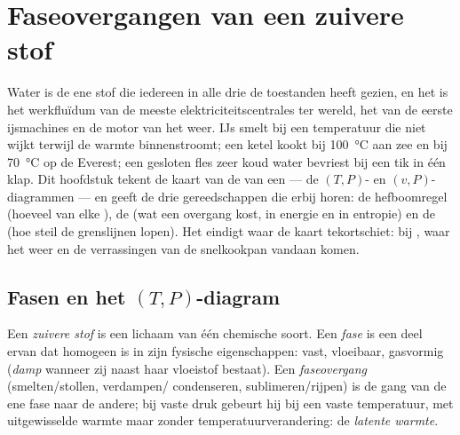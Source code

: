 \chapter{Faseovergangen van een zuivere stof}\label{ch:b1:phase-changes}

Water is de ene stof die iedereen in alle drie de toestanden heeft gezien,
en het is het werkfluïdum van de meeste elektriciteitscentrales ter wereld, het
 van de eerste ijsmachines en de motor van het weer.
IJs smelt bij een temperatuur die niet wijkt terwijl de warmte binnenstroomt;
een ketel kookt bij \qty{100}{\degreeCelsius} aan zee en bij
\qty{70}{\degreeCelsius} op de Everest; een gesloten fles zeer koud water
bevriest bij een tik in één klap. Dit hoofdstuk tekent de kaart van de  van een
 --- de $(T, P)$- en $(v, P)$-diagrammen --- en geeft de
drie gereedschappen die erbij horen: de hefboomregel (hoeveel van elke ),
de  (wat een overgang kost, in energie en in entropie) en de
 (hoe steil de grenslijnen lopen). Het eindigt
waar de kaart tekortschiet: bij , waar het weer
en de verrassingen van de snelkookpan vandaan komen.

\section{Fasen en het $(T, P)$-diagram}

\begin{definition}\label{def:b1:phase-changes:phase}
Een \emph{zuivere stof} is een lichaam van één chemische soort. Een
\emph{fase} is een deel ervan dat homogeen is in zijn fysische
eigenschappen: vast, vloeibaar, gasvormig (\emph{damp} wanneer zij naast haar
vloeistof bestaat). Een \emph{faseovergang} (smelten/stollen, verdampen/
condenseren, sublimeren/rijpen) is de gang van de ene fase naar de
andere; bij vaste druk gebeurt hij bij een vaste temperatuur, met uitgewisselde
warmte maar zonder temperatuurverandering: de \emph{latente warmte}.
\end{definition}

